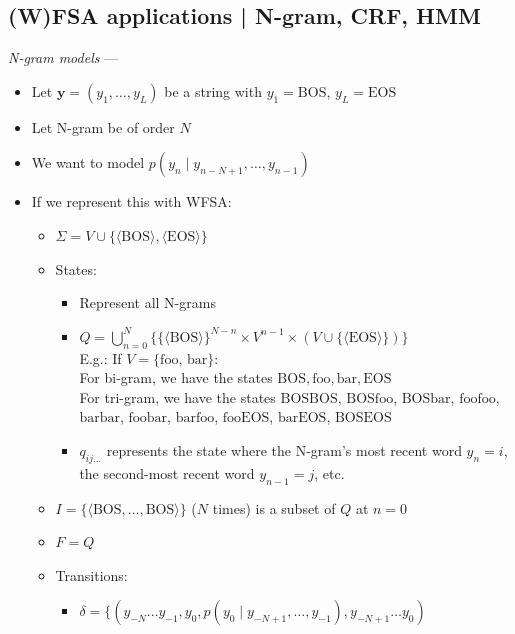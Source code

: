 \subsection*{(W)FSA applications | N-gram, CRF, HMM}
\emph{N-gram models} --- 
\begin{itemize}
    \item Let $\boldsymbol{y} = (y_1, \ldots, y_L)$ be a string with $y_1 = \textrm{BOS}$, $y_L = \textrm{EOS}$
    \item Let N-gram be of order $N$
    \item We want to model 
    $
    p(y_n \mid y_{n-N+1}, \ldots, y_{n-1})
    $    
    \item If we represent this with WFSA:
    \begin{itemize}
        \item $\Sigma = V \cup \{\langle \textrm{BOS} \rangle, \langle\textrm{EOS} \rangle\}$
        \item States:
        \begin{itemize}
            \item Represent all N-grams
            \item $Q = \bigcup_{n=0}^N \{ \{\langle \textrm{BOS} \rangle\}^{N-n} \times V^{n-1} \times (V \cup \{\langle \textrm{EOS} \rangle\}) \}$\\
            E.g.: If $V = \{ \textrm{foo, bar} \}$:\\
            For bi-gram, we have the states $\textrm{BOS}, \textrm{foo}, \textrm{bar}, \textrm{EOS}$\\
            For tri-gram, we have the states $\textrm{BOS}\textrm{BOS}$, $ \textrm{BOS}\textrm{foo}$, $ \textrm{BOS}\textrm{bar}$, $ \textrm{foo}\textrm{foo}$, $ \textrm{bar}\textrm{bar}$, $ \textrm{foo}\textrm{bar}$, $ \textrm{bar}\textrm{foo}$, $ \textrm{foo}\textrm{EOS}$, $
            \textrm{bar}\textrm{EOS}$, $
            \textrm{BOS}\textrm{EOS}$
            \item $q_{ij...}$ represents the state where the N-gram's most recent word $y_n  = i$, the second-most recent word $y_{n-1}  = j$, etc.
        \end{itemize}
        \item $I = \{\langle \textrm{BOS}, \ldots, \textrm{BOS} \rangle\}$ ($N$ times) is a subset of $Q$ at $n=0$
        \item $F = Q$
        \item Transitions:
        \begin{itemize}
            \item $\delta = \big\{ (y_{-N} \ldots y_{-1}, y_0, p(y_0 \mid y_{-N+1}, \ldots, y_{-1}), y_{-N+1} \ldots y_0 )$\\

\end{itemize}
\end{itemize}
\end{itemize}
